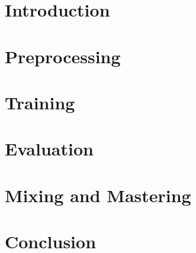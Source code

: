 \documentclass[a4paper]{article}
\subtitle \\
\author{\StudNumeOne}
\begin{document}
\section*{Introduction}



\section*{Preprocessing}



\section*{Training}



\section*{Evaluation}



\section*{Mixing and Mastering}



\section*{Conclusion}
\end{document}
